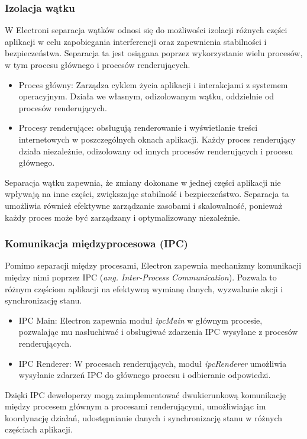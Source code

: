 \documentclass[12pt,a4paper,twoside]{article}
\begin{document}
\subsubsection*{Izolacja wątku}
W Electroni separacja wątków odnosi się do możliwości izolacji różnych części aplikacji w celu zapobiegania interferencji oraz zapewnienia stabilności i bezpieczeństwa. Separacja ta jest osiągana poprzez wykorzystanie wielu procesów, w tym procesu głównego i procesów renderujących.
\begin{itemize}
	\item Proces główny: Zarządza cyklem życia aplikacji i interakcjami z systemem operacyjnym. Działa we własnym, odizolowanym wątku, oddzielnie od procesów renderujących.
	\item Procesy renderujące: obsługują renderowanie i wyświetlanie treści internetowych w poszczególnych oknach aplikacji. Każdy proces renderujący działa niezależnie, odizolowany od innych procesów renderujących i procesu głównego.
\end{itemize}
Separacja wątku zapewnia, że zmiany dokonane w jednej części aplikacji nie wpływają na inne części, zwiększając stabilność i bezpieczeństwo. Separacja ta umożliwia również efektywne zarządzanie zasobami i skalowalność, ponieważ każdy proces może być zarządzany i optymalizowany niezależnie.
\subsubsection*{Komunikacja międzyprocesowa (IPC)}
Pomimo separacji między procesami, Electron zapewnia mechanizmy komunikacji między nimi poprzez IPC (\textit{ang. Inter-Process Communication}). Pozwala to różnym częściom aplikacji na efektywną wymianę danych, wyzwalanie akcji i synchronizację stanu.
\begin{itemize}
	\item IPC Main: Electron zapewnia moduł \textit{ipcMain} w głównym procesie, pozwalając mu nasłuchiwać i obsługiwać zdarzenia IPC wysyłane z procesów renderujących.
	\item IPC Renderer: W procesach renderujących, moduł \textit{ipcRenderer}	 umożliwia wysyłanie zdarzeń IPC do głównego procesu i odbieranie odpowiedzi.
\end{itemize}
Dzięki IPC deweloperzy mogą zaimplementować dwukierunkową komunikację między procesem głównym a procesami renderującymi, umożliwiając im koordynację działań, udostępnianie danych i synchronizację stanu w różnych częściach aplikacji.\par
\newpage
\end{document}

